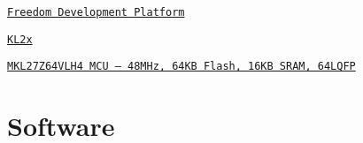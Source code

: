 
\begin{DoxyItemize}
\item \href{http://www.nxp.com/products/developer-resources/hardware-development-tools/freedom-development-boards/freedom-development-platform-for-kinetis-kl17-and-kl27-mcus:FRDM-KL27Z}{\tt Freedom Development Platform}
\item \href{http://www.nxp.com/products/microcontrollers-and-processors/arm-processors/kinetis-cortex-m-mcus/l-series-ultra-low-power-m0-plus/kinetis-kl2x-48-mhz-usb-ultra-low-power-microcontrollers-mcus-based-on-arm-cortex-m0-plus-core:KL2x}{\tt K\-L2x}
\item \href{http://www.nxp.com/docs/en/data-sheet/KL27P64M48SF2.pdf}{\tt M\-K\-L27\-Z64\-V\-L\-H4 M\-C\-U – 48\-M\-Hz, 64\-K\-B Flash, 16\-K\-B S\-R\-A\-M, 64\-L\-Q\-F\-P}
\end{DoxyItemize}

\section*{Software}